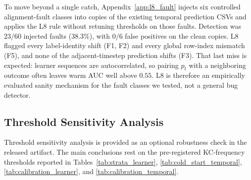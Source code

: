To move beyond a single catch, Appendix~\ref{app:l8_fault} injects six controlled alignment-fault classes into copies of the existing temporal prediction CSVs and applies the L8 rule without retuning thresholds on those faults. Detection was $23/60$ injected faults ($38.3\%$), with $0/6$ false positives on the clean copies. L8 flagged every label-identity shift (F1, F2) and every global row-index mismatch (F5), and none of the adjacent-timestep prediction shifts (F3). That last miss is expected: learner sequences are autocorrelated, so pairing $p_t$ with a neighboring outcome often leaves warm AUC well above $0.55$. L8 is therefore an empirically evaluated sanity mechanism for the fault classes we tested, not a general bug detector.

\subsection{Threshold Sensitivity Analysis}
Threshold sensitivity analysis is provided as an optional robustness check in the released artifact. The main conclusions rest on the pre-registered KC-frequency thresholds reported in Tables~\ref{tab:strata_learner}, \ref{tab:cold_start_temporal}, \ref{tab:calibration_learner}, and \ref{tab:calibration_temporal}.
